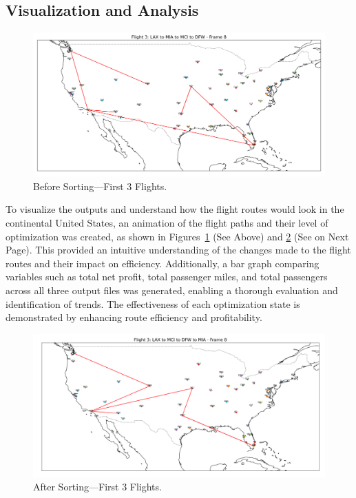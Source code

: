 \documentclass{article}
\begin{document}
\subsection*{Visualization and Analysis}

\begin{figure}[H] 
\centering

\begin{minipage}{\textwidth}
    \centering
    \includegraphics[width=\textwidth]{images/unsort_vis.png}
    \caption{Before Sorting—First 3 Flights.}
    \label{fig:top}
\end{minipage}

\end{figure}

To visualize the outputs and understand how the flight routes would look in the continental United States, an animation of the flight paths and their level of optimization was created, as shown in Figures~\ref{fig:top} (See Above) and \ref{fig:bottom} (See on Next Page). This provided an intuitive understanding of the changes made to the flight routes and their impact on efficiency. Additionally, a bar graph comparing variables such as total net profit, total passenger miles, and total passengers across all three output files was generated, enabling a thorough evaluation and identification of trends. The effectiveness of each optimization state is demonstrated by enhancing route efficiency and profitability.

\begin{figure}[H] 
\centering

\begin{minipage}{\textwidth}
    \centering
    \includegraphics[width=\textwidth]{images/sort_vis.png}
    \caption {After Sorting—First 3 Flights.}
    \label{fig:bottom}
\end{minipage}

\end{figure}
\end{document}
